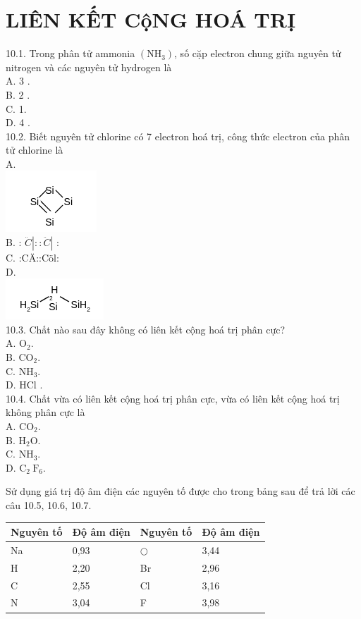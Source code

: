 \documentclass[10pt]{article}
\begin{document}
\section*{LIÊN KẾT CộNG HOÁ TRỊ}
10.1. Trong phân tử ammonia $\left(\mathrm{NH}_{3}\right)$, số cặp electron chung giữa nguyên tử nitrogen và các nguyên tử hydrogen là\\
A. 3 .\\
B. 2 .\\
C. 1.\\
D. 4 .\\
10.2. Biết nguyên tử chlorine có 7 electron hoá trị, công thức electron của phân tử chlorine là\\
A.\\
\includegraphics{smile-fceb65d9546d5a894720e73ad67bc570d357c4c2}\\
B. : $\ddot{C}|:: \ddot{C}|$ :\\
C. :CÄ::Cöl:\\
D.\\
\includegraphics{smile-e90efded0fc5444409a710e3e1a693a3ef80a076}\\
10.3. Chất nào sau đây không có liên kết cộng hoá trị phân cực?\\
A. $\mathrm{O}_{2}$.\\
B. $\mathrm{CO}_{2}$.\\
C. $\mathrm{NH}_{3}$.\\
D. HCl .\\
10.4. Chất vừa có liên kết cộng hoá trị phân cực, vừa có liên kết cộng hoá trị không phân cực là\\
A. $\mathrm{CO}_{2}$.\\
B. $\mathrm{H}_{2} \mathrm{O}$.\\
C. $\mathrm{NH}_{3}$.\\
D. $\mathrm{C}_{2} \mathrm{~F}_{6}$.

Sử dụng giá trị độ âm điện các nguyên tố được cho trong bảng sau để trả lời các câu 10.5, 10.6, 10.7.

\begin{center}
\begin{tabular}{|l|l|l|l|}
\hline
Nguyên tố & Độ âm điện & Nguyên tố & Độ âm điện \\
\hline
Na & 0,93 & $\bigcirc$ & 3,44 \\
\hline
H & 2,20 & Br & 2,96 \\
\hline
C & 2,55 & Cl & 3,16 \\
\hline
N & 3,04 & F & 3,98 \\
\hline
\end{tabular}
\end{center}
\end{document}
